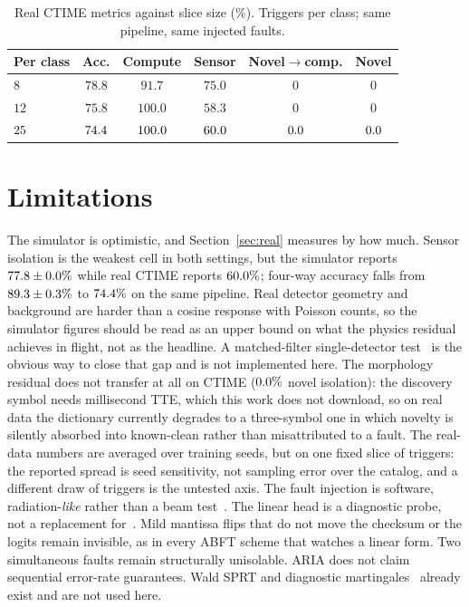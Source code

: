 \documentclass[journal]{IEEEtran}
\begin{document}
\begin{table}[!t]
\caption{Real CTIME metrics against slice size (\%). Triggers per class; same pipeline, same injected faults.}
\label{tab:realtrend}
\centering
\begin{tabular}{lccccc}
\toprule
Per class & Acc. & Compute & Sensor & Novel$\to$comp. & Novel \\
\midrule
$8$  & $78.8$ & $91.7$ & $75.0$ & $0$ & $0$ \\
$12$ & $75.8$ & $100.0$ & $58.3$ & $0$ & $0$ \\
$25$ & $74.4$ & $100.0$ & $60.0$ & $0.0$ & $0.0$ \\
\bottomrule
\end{tabular}
\end{table}

\section{Limitations}

The simulator is optimistic, and Section~\ref{sec:real} measures by how much. Sensor isolation is the weakest cell in both settings, but the simulator reports $77.8\pm0.0\%$ while real CTIME reports $60.0\%$; four-way accuracy falls from $89.3\pm0.3\%$ to $74.4\%$ on the same pipeline. Real detector geometry and background are harder than a cosine response with Poisson counts, so the simulator figures should be read as an upper bound on what the physics residual achieves in flight, not as the headline. A matched-filter single-detector test~\cite{veske2025} is the obvious way to close that gap and is not implemented here. The morphology residual does not transfer at all on CTIME ($0.0\%$ novel isolation): the discovery symbol needs millisecond TTE, which this work does not download, so on real data the dictionary currently degrades to a three-symbol one in which novelty is silently absorbed into known-clean rather than misattributed to a fault. The real-data numbers are averaged over \RealSeeds{} training seeds, but on one fixed slice of \RealCubes{} triggers: the reported spread is seed sensitivity, not sampling error over the catalog, and a different draw of triggers is the untested axis. The fault injection is software, radiation-\emph{like} rather than a beam test~\cite{reagen2016}. The linear head is a diagnostic probe, not a replacement for~\cite{john2025}. Mild mantissa flips that do not move the checksum or the logits remain invisible, as in every ABFT scheme that watches a linear form. Two simultaneous faults remain structurally unisolable. ARIA does not claim sequential error-rate guarantees. Wald SPRT and diagnostic martingales~\cite{wald1947,hindy2025} already exist and are not used here.
\end{document}
